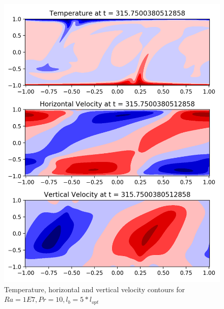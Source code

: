 \documentclass[12pt]{article}
\begin{document}
     \begin{figure}[!htb]
     	\includegraphics[width=\linewidth]{contours_1E7_10_5.png}
     	\caption{Temperature, horizontal and vertical velocity contours for $Ra = 1E7, Pr =10, l_b = 5* l_{opt} $ }
     	\label{fig:fig19}
     \end{figure}
     
\end{document}
